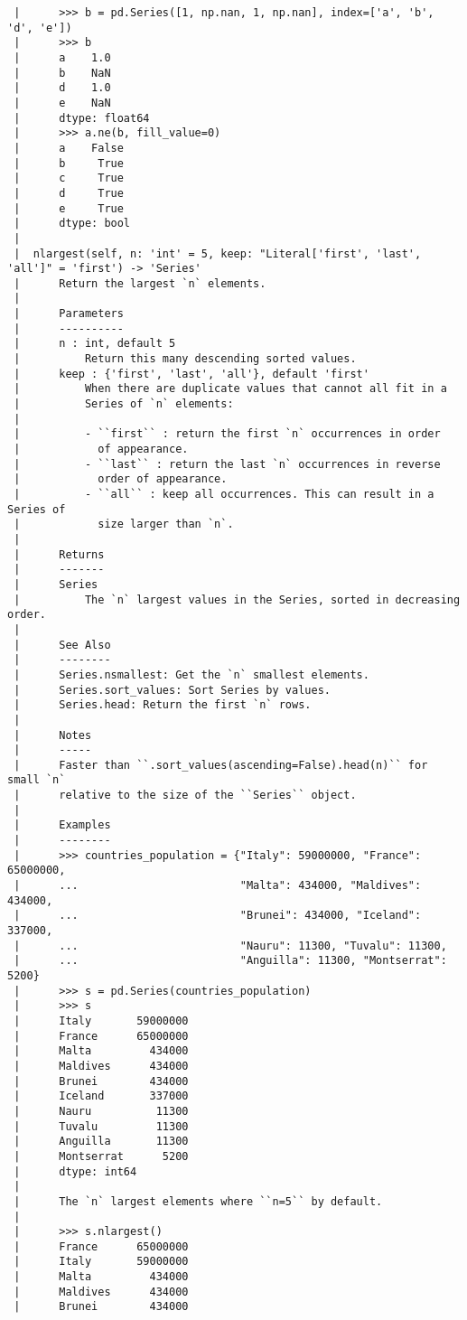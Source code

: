 \documentclass[
  letterpaper,
  DIV=11,
  numbers=noendperiod]{scrreprt}
\begin{document}
\begin{verbatim}
 |      >>> b = pd.Series([1, np.nan, 1, np.nan], index=['a', 'b', 'd', 'e'])
 |      >>> b
 |      a    1.0
 |      b    NaN
 |      d    1.0
 |      e    NaN
 |      dtype: float64
 |      >>> a.ne(b, fill_value=0)
 |      a    False
 |      b     True
 |      c     True
 |      d     True
 |      e     True
 |      dtype: bool
 |  
 |  nlargest(self, n: 'int' = 5, keep: "Literal['first', 'last', 'all']" = 'first') -> 'Series'
 |      Return the largest `n` elements.
 |      
 |      Parameters
 |      ----------
 |      n : int, default 5
 |          Return this many descending sorted values.
 |      keep : {'first', 'last', 'all'}, default 'first'
 |          When there are duplicate values that cannot all fit in a
 |          Series of `n` elements:
 |      
 |          - ``first`` : return the first `n` occurrences in order
 |            of appearance.
 |          - ``last`` : return the last `n` occurrences in reverse
 |            order of appearance.
 |          - ``all`` : keep all occurrences. This can result in a Series of
 |            size larger than `n`.
 |      
 |      Returns
 |      -------
 |      Series
 |          The `n` largest values in the Series, sorted in decreasing order.
 |      
 |      See Also
 |      --------
 |      Series.nsmallest: Get the `n` smallest elements.
 |      Series.sort_values: Sort Series by values.
 |      Series.head: Return the first `n` rows.
 |      
 |      Notes
 |      -----
 |      Faster than ``.sort_values(ascending=False).head(n)`` for small `n`
 |      relative to the size of the ``Series`` object.
 |      
 |      Examples
 |      --------
 |      >>> countries_population = {"Italy": 59000000, "France": 65000000,
 |      ...                         "Malta": 434000, "Maldives": 434000,
 |      ...                         "Brunei": 434000, "Iceland": 337000,
 |      ...                         "Nauru": 11300, "Tuvalu": 11300,
 |      ...                         "Anguilla": 11300, "Montserrat": 5200}
 |      >>> s = pd.Series(countries_population)
 |      >>> s
 |      Italy       59000000
 |      France      65000000
 |      Malta         434000
 |      Maldives      434000
 |      Brunei        434000
 |      Iceland       337000
 |      Nauru          11300
 |      Tuvalu         11300
 |      Anguilla       11300
 |      Montserrat      5200
 |      dtype: int64
 |      
 |      The `n` largest elements where ``n=5`` by default.
 |      
 |      >>> s.nlargest()
 |      France      65000000
 |      Italy       59000000
 |      Malta         434000
 |      Maldives      434000
 |      Brunei        434000

\end{verbatim}
\end{document}
